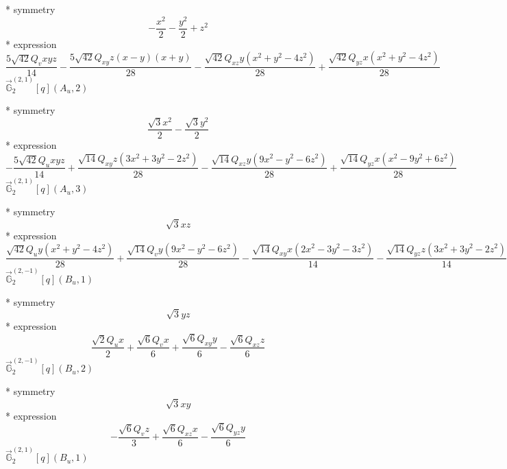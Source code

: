 \documentclass[fleqn,8pt]{jsarticle}
\begin{document}
\noindent\quad ** symmetry
\begin{dmath*}
- \frac{x^{2}}{2} - \frac{y^{2}}{2} + z^{2}
\end{dmath*}
\noindent\quad ** expression
\begin{dmath*}
\frac{5 \sqrt{42} Q_{v} x y z}{14} - \frac{5 \sqrt{42} Q_{xy} z \left(x - y\right) \left(x + y\right)}{28} - \frac{\sqrt{42} Q_{xz} y \left(x^{2} + y^{2} - 4 z^{2}\right)}{28} + \frac{\sqrt{42} Q_{yz} x \left(x^{2} + y^{2} - 4 z^{2}\right)}{28}
\end{dmath*}
\noindent\quad $\vec{\mathbb{G}}_{2}^{(2,1)}[q](A_{u},2)$

\noindent\quad ** symmetry
\begin{dmath*}
\frac{\sqrt{3} x^{2}}{2} - \frac{\sqrt{3} y^{2}}{2}
\end{dmath*}
\noindent\quad ** expression
\begin{dmath*}
- \frac{5 \sqrt{42} Q_{u} x y z}{14} + \frac{\sqrt{14} Q_{xy} z \left(3 x^{2} + 3 y^{2} - 2 z^{2}\right)}{28} - \frac{\sqrt{14} Q_{xz} y \left(9 x^{2} - y^{2} - 6 z^{2}\right)}{28} + \frac{\sqrt{14} Q_{yz} x \left(x^{2} - 9 y^{2} + 6 z^{2}\right)}{28}
\end{dmath*}
\noindent\quad $\vec{\mathbb{G}}_{2}^{(2,1)}[q](A_{u},3)$

\noindent\quad ** symmetry
\begin{dmath*}
\sqrt{3} x z
\end{dmath*}
\noindent\quad ** expression
\begin{dmath*}
\frac{\sqrt{42} Q_{u} y \left(x^{2} + y^{2} - 4 z^{2}\right)}{28} + \frac{\sqrt{14} Q_{v} y \left(9 x^{2} - y^{2} - 6 z^{2}\right)}{28} - \frac{\sqrt{14} Q_{xy} x \left(2 x^{2} - 3 y^{2} - 3 z^{2}\right)}{14} - \frac{\sqrt{14} Q_{yz} z \left(3 x^{2} + 3 y^{2} - 2 z^{2}\right)}{14}
\end{dmath*}
\noindent\quad $\vec{\mathbb{G}}_{2}^{(2,-1)}[q](B_{u},1)$

\noindent\quad ** symmetry
\begin{dmath*}
\sqrt{3} y z
\end{dmath*}
\noindent\quad ** expression
\begin{dmath*}
\frac{\sqrt{2} Q_{u} x}{2} + \frac{\sqrt{6} Q_{v} x}{6} + \frac{\sqrt{6} Q_{xy} y}{6} - \frac{\sqrt{6} Q_{xz} z}{6}
\end{dmath*}
\noindent\quad $\vec{\mathbb{G}}_{2}^{(2,-1)}[q](B_{u},2)$

\noindent\quad ** symmetry
\begin{dmath*}
\sqrt{3} x y
\end{dmath*}
\noindent\quad ** expression
\begin{dmath*}
- \frac{\sqrt{6} Q_{v} z}{3} + \frac{\sqrt{6} Q_{xz} x}{6} - \frac{\sqrt{6} Q_{yz} y}{6}
\end{dmath*}
\noindent\quad $\vec{\mathbb{G}}_{2}^{(2,1)}[q](B_{u},1)$
\end{document}
